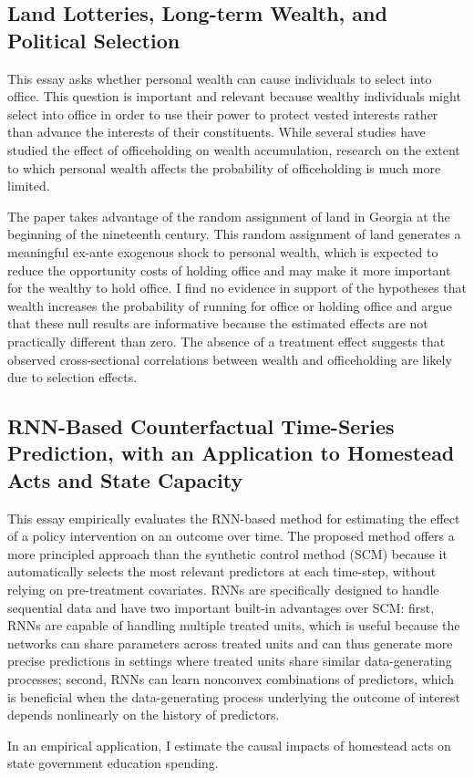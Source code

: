 \subsection{Land Lotteries, Long-term Wealth, and Political Selection} 
This essay asks whether personal wealth can cause individuals to select into office. This question is important and relevant because wealthy individuals might select into office in order to use their power to protect vested interests rather than advance the interests of their constituents. While several studies have studied the effect of officeholding on wealth accumulation, research on the extent to which personal wealth affects the probability of officeholding is much more limited.

The paper takes advantage of the random assignment of land in Georgia at the beginning of the nineteenth century. This random assignment of land generates a meaningful ex-ante exogenous shock to personal wealth, which is expected to reduce the opportunity costs of holding office and may make it more important for the wealthy to hold office. I find no evidence in support of the hypotheses that wealth increases the probability of running for office or holding office and argue that these null results are informative because the estimated effects are not practically different than zero. The absence of a treatment effect suggests that observed cross-sectional correlations between wealth and officeholding are likely due to selection effects. 

\subsection{RNN-Based Counterfactual Time-Series Prediction, with an Application to Homestead Acts and State Capacity}
This essay empirically evaluates the RNN-based method for estimating the effect of a policy intervention on an outcome over time. The proposed method offers a more principled approach than the synthetic control method (SCM) because it automatically selects the most relevant predictors at each time-step, without relying on pre-treatment covariates. RNNs are specifically designed to handle sequential data and have two important built-in advantages over SCM: first, RNNs are capable of handling multiple treated units, which is useful because the networks can share parameters across treated units and can thus generate more precise predictions in settings where treated units share similar data-generating processes; second, RNNs can learn nonconvex combinations of predictors, which is beneficial when the data-generating process underlying the outcome of interest depends nonlinearly on the history of predictors. 

In an empirical application, I estimate the causal impacts of homestead acts on state government education spending.